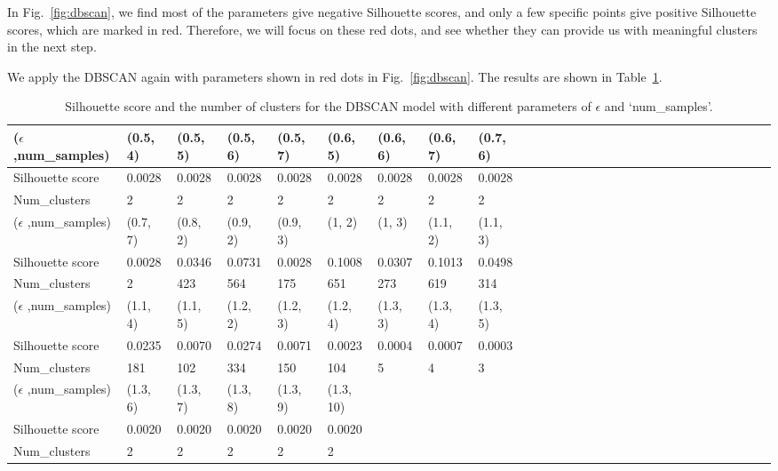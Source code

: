\documentclass{article}
\begin{document}
    In Fig.~\ref{fig:dbscan}, we find most of the parameters give negative Silhouette scores, and only a few specific points give positive Silhouette scores, which are marked in red. Therefore, we will focus on these red dots, and see whether they can provide us with meaningful clusters in the next step.

    We apply the DBSCAN again with parameters shown in red dots in Fig.~\ref{fig:dbscan}. The results are shown in Table~\ref{tab}. 

    \begin{table}[h]
        \caption{Silhouette score and the number of clusters for the DBSCAN model with different parameters of $\epsilon$ and `num\_samples'.}
        \label{tab}
        \begin{tabular}{|l|l|l|l|l|l|l|l|l|l|l|l|l|l|l|l|l|l|l|l|l|l|l|l|l|l|l|l|l}
        \hline
        ($\epsilon$ ,num\_samples) &(0.5, 4)& (0.5, 5)& (0.5, 6)& (0.5, 7)& (0.6, 5)& (0.6, 6)& (0.6, 7)& (0.7, 6)\\
        \hline
        Silhouette score & 0.0028&0.0028&0.0028&0.0028&0.0028&0.0028&0.0028&0.0028 \\
        \hline
        Num\_clusters & 2&2&2&2&2&2&2&2\\        
        \hline
        \hline
        ($\epsilon$ ,num\_samples) & (0.7, 7)& (0.8, 2) & (0.9, 2)& (0.9, 3)& (1, 2)& (1, 3)& (1.1, 2)& (1.1, 3) \\
        \hline
        Silhouette score & 0.0028&0.0346&0.0731&0.0028&0.1008&0.0307&0.1013&0.0498\\
        \hline
        Num\_clusters & 2&423&564&175&651&273&619&314\\
        \hline
        \hline
        ($\epsilon$ ,num\_samples) & (1.1, 4)& (1.1, 5)& (1.2, 2)& (1.2, 3)& (1.2, 4)& (1.3, 3) & (1.3, 4) & (1.3, 5)\\
        \hline        
        Silhouette score & 0.0235&0.0070&0.0274&0.0071&0.0023&0.0004&0.0007&0.0003\\
        \hline
        Num\_clusters & 181&102&334&150&104&5&4&3 \\
        \hline
        \hline
        ($\epsilon$ ,num\_samples) & (1.3, 6)& (1.3, 7)& (1.3, 8)& (1.3, 9)& (1.3, 10) &&&\\
        \hline
        Silhouette score &  0.0020&0.0020&0.0020&0.0020&0.0020 &&&\\
        \hline
        Num\_clusters & 2&2&2&2&2 &&&\\
        \hline
        \end{tabular}
        
        \end{table}
\end{document}
